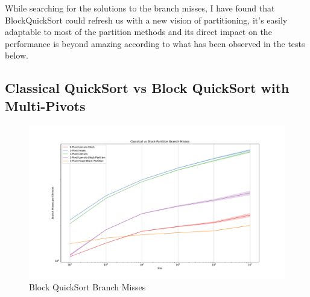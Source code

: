 \documentclass[a4paper,oneside,12pt]{book}
\begin{document}
While searching for the solutions to the branch misses, I have found that BlockQuickSort could refresh us with a new vision of partitioning, it's easily adaptable to most of the partition methods and its direct impact on the performance is beyond amazing
according to what has been observed in the tests below.

\subsection{Classical QuickSort vs Block QuickSort with Multi-Pivots}

\begin{figure}[H]
    \hypertarget{fig:blockbranchmiss}{}
    \caption{Block QuickSort Branch Misses}
    \centering
    \hspace*{-0.175\textwidth}
    \includegraphics[width=1.3\textwidth]{Classical vs Block Partition Branch Misses.pdf}
\end{figure}
\end{document}
